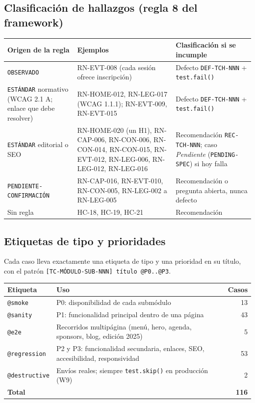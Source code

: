 \documentclass[11pt,a4paper]{article}
\begin{document}
\subsection{Clasificación de hallazgos (regla 8 del framework)}

\begin{table}[H]
\centering\small
\begin{tabularx}{\textwidth}{@{}>{\raggedright\arraybackslash}p{} X >{\raggedright\arraybackslash}p{}@{}}
\toprule
Origen de la regla & Ejemplos & Clasificación si se incumple \\
\midrule
\texttt{OBSERVADO} & RN-EVT-008 (cada sesión ofrece inscripción) & Defecto \texttt{DEF-TCH-NNN} + \texttt{test.fail()} \\
\texttt{ESTÁNDAR} normativo (WCAG 2.1 A; enlace que debe resolver) & RN-HOME-012, RN-LEG-017 (WCAG 1.1.1); RN-EVT-009, RN-EVT-015 & Defecto \texttt{DEF-TCH-NNN} + \texttt{test.fail()} \\
\texttt{ESTÁNDAR} editorial o SEO & RN-HOME-020 (un H1), RN-CAP-006, RN-CON-006, RN-CON-014, RN-CON-015, RN-EVT-012, RN-LEG-006, RN-LEG-012, RN-LEG-016 & Recomendación \texttt{REC-TCH-NNN}; caso \textit{Pendiente} (\texttt{PENDING-SPEC}) si hoy falla \\
\texttt{PENDIENTE-CONFIRMACIÓN} & RN-CAP-016, RN-EVT-010, RN-CON-005, RN-LEG-002 a RN-LEG-005 & Recomendación o pregunta abierta, nunca defecto \\
Sin regla & HC-18, HC-19, HC-21 & Recomendación \\
\bottomrule
\end{tabularx}
\end{table}

\subsection{Etiquetas de tipo y prioridades}

Cada caso lleva exactamente una etiqueta de tipo y una prioridad en su título, con el patrón
\texttt{[TC-MÓDULO-SUB-NNN] título @P0..@P3}.

\begin{table}[H]
\centering\small
\begin{tabularx}{\textwidth}{@{}l X r@{}}
\toprule
Etiqueta & Uso & Casos \\
\midrule
\texttt{@smoke} & P0: disponibilidad de cada submódulo & 13 \\
\texttt{@sanity} & P1: funcionalidad principal dentro de una página & 43 \\
\texttt{@e2e} & Recorridos multipágina (menú, hero, agenda, sponsors, blog, edición 2025) & 5 \\
\texttt{@regression} & P2 y P3: funcionalidad secundaria, enlaces, SEO, accesibilidad, responsividad & 53 \\
\texttt{@destructive} & Envíos reales; siempre \texttt{test.skip()} en producción (W9) & 2 \\
\midrule
\textbf{Total} & & \textbf{116} \\
\bottomrule
\end{tabularx}
\end{table}
\end{document}
